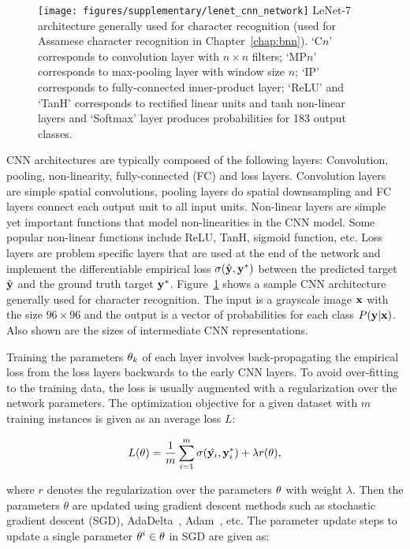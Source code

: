 \begin{figure}[t!]
 \centering
 \texttt{[image: figures/supplementary/lenet\_cnn\_network]}
 {LeNet-7~\cite{lecun1998mnist} architecture generally used for character recognition
 (used for Assamese character recognition in Chapter~\ref{chap:bnn}).
 `C$n$' corresponds to convolution layer with $n\times n$ filters; `MP$n$' corresponds
 to max-pooling layer with window size $n$; `IP' corresponds to fully-connected
 inner-product layer; `ReLU' and `TanH' corresponds to rectified linear units
 and tanh non-linear layers and `Softmax' layer produces probabilities for 183
 output classes.}
\label{fig:lenet7}
\end{figure}

CNN architectures are typically composed of the following layers: Convolution,
pooling, non-linearity, fully-connected (FC) and loss layers.
Convolution layers are simple spatial convolutions,
pooling layers do spatial downsampling
and FC layers connect each output unit to all input units. Non-linear layers
are simple yet important functions that model non-linearities in the CNN
model. Some popular non-linear functions include ReLU, TanH, sigmoid function,
etc. Loss layers are problem specific layers that are used at the end of the
network and implement the differentiable empirical loss $\sigma(\hat{\mathbf{y}}, \mathbf{y}^*)$
between the predicted target $\hat{\mathbf{y}}$ and the ground truth target $\mathbf{y}^*$.
Figure~\ref{fig:lenet7} shows a sample CNN architecture generally used for character
recognition. The input is a grayscale image $\mathbf{x}$ with the size $96\times96$ and the
output is a vector of probabilities for each class $P(\mathbf{y}|\mathbf{x})$. Also shown
are the sizes of intermediate CNN representations.

Training the parameters $\mathbf{\theta}_k$ of each layer involves back-propagating
the empirical loss from the loss layers backwards to the early CNN layers.
To avoid over-fitting to the training data, the loss is usually augmented
with a regularization over the network parameters. The optimization objective
for a given dataset with $m$ training instances is given as an average loss $L$:

\begin{equation}
L(\mathbf{\theta}) = \frac{1}{m} \sum_{i=1}^{m} \sigma(\hat{\mathbf{y}_i}, \mathbf{y}_i^{*}) + \lambda r(\mathbf{\theta}),
\end{equation}

where $r$ denotes the regularization over the parameters $\mathbf{\theta}$ with weight $\lambda$.
Then the parameters $\theta$ are updated using gradient descent methods
such as stochastic gradient descent (SGD), AdaDelta~\cite{zeiler2012adadelta},
Adam~\cite{kingma2014adam}, etc.
The parameter update steps to update a single parameter $\mathbf{\theta}^i \in \mathbf{\theta}$ in SGD are given as:

